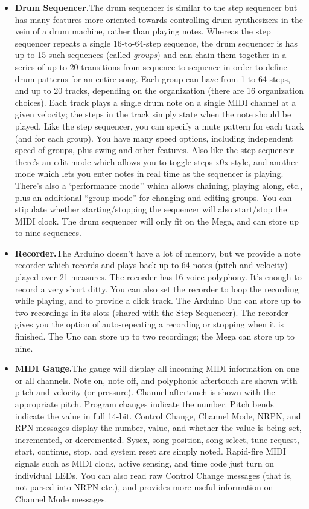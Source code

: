 \documentclass{article}
\begin{document}
\begin{itemize}
\item {\bf Drum Sequencer.}\quad The drum sequencer is similar to the step sequencer but has many features more oriented towards controlling drum synthesizers in the vein of a drum machine, rather than playing notes.  Whereas the step sequencer repeats a single 16-to-64-step sequence, the drum sequencer is has up to 15 such sequences (called {\it groups}) and can chain them together in a series of up to 20 transitions from sequence to sequence in order to define drum patterns for an entire song.  Each group can have from 1 to 64 steps, and up to 20 tracks, depending on the organization (there are 16 organization choices). Each track plays a single drum note on a single MIDI channel at a given velocity; the steps in the track simply state when the note should be played.  Like the step sequencer, you can specify a mute pattern for each track (and for each group). You have many speed options, including independent speed of groups, plus swing and other features.  Also like the step sequencer there's an edit mode which allows you to toggle steps x0x-style, and another mode which lets you enter notes in real time as the sequencer is playing.  There's also a `performance mode'' which allows chaining, playing along, etc., plus an additional ``group mode'' for changing and editing groups.  You can stipulate whether starting/stopping the sequencer will also start/stop the MIDI clock.    The drum sequencer will only fit on the Mega, and can store up to nine sequences.

\item {\bf Recorder.}\quad The Arduino doesn't have a lot of memory, but we provide a note recorder which records and plays back up to 64 notes (pitch and velocity) played over 21 measures. The recorder has 16-voice polyphony.   It's enough to record a very short ditty.  You can also set the recorder to loop the recording while playing, and to provide a click track.  The Arduino Uno can store up to two recordings in its slots (shared with the Step Sequencer).  The recorder gives you the option of auto-repeating a recording or stopping when it is finished.  The Uno can store up to two recordings; the Mega can store up to nine.

\item {\bf MIDI Gauge.}\quad The gauge will display all incoming MIDI information on one or all channels.  Note on, note off, and polyphonic aftertouch are shown with pitch and velocity (or pressure).  Channel aftertouch is shown with the appropriate pitch.  Program changes indicate the number.  Pitch bends indicate the value in full 14-bit.  Control Change, Channel Mode, NRPN, and RPN messages display the number, value, and whether the value is being set, incremented, or decremented.  Sysex, song position, song select, tune request, start, continue, stop, and system reset are simply noted.  Rapid-fire MIDI signals such as MIDI clock, active sensing, and time code just turn on individual LEDs. You can also read raw Control Change messages (that is, not parsed into NRPN etc.), and provides more useful information on Channel Mode messages.


\end{itemize}
\end{document}
